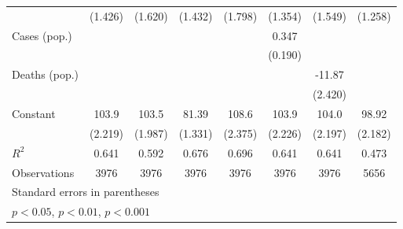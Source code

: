 \documentclass{article}
\begin{document}
{\begin{longtable}{l*{7}{c}}
                &  (1.426)         &  (1.620)         &  (1.432)         &  (1.798)         &  (1.354)         &  (1.549)         &  (1.258)         \\
Cases (pop.)    &                  &                  &                  &                  &    0.347         &                  &                  \\
                &                  &                  &                  &                  &  (0.190)         &                  &                  \\
Deaths (pop.)   &                  &                  &                  &                  &                  &   -11.87\sym{***}&                  \\
                &                  &                  &                  &                  &                  &  (2.420)         &                  \\
Constant        &    103.9\sym{***}&    103.5\sym{***}&    81.39\sym{***}&    108.6\sym{***}&    103.9\sym{***}&    104.0\sym{***}&    98.92\sym{***}\\
                &  (2.219)         &  (1.987)         &  (1.331)         &  (2.375)         &  (2.226)         &  (2.197)         &  (2.182)         \\
\hline
\(R^{2}\)       &    0.641         &    0.592         &    0.676         &    0.696         &    0.641         &    0.641         &    0.473         \\
Observations    &     3976         &     3976         &     3976         &     3976         &     3976         &     3976         &     5656         \\
\hline\hline
\multicolumn{8}{l}{\footnotesize Standard errors in parentheses}\\
\multicolumn{8}{l}{\footnotesize \sym{*} \(p<0.05\), \sym{**} \(p<0.01\), \sym{***} \(p<0.001\)}\\
\end{longtable}
}
\end{document}
